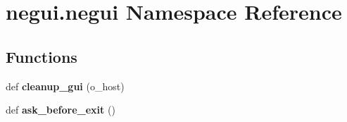 \hypertarget{namespacenegui_1_1negui}{}\section{negui.\+negui Namespace Reference}
\label{namespacenegui_1_1negui}
\subsection*{Functions}
\begin{DoxyCompactItemize}
\item 
def {\bfseries cleanup\+\_\+gui} (o\+\_\+host)\hypertarget{namespacenegui_1_1negui_a633f9fe59f5e342abb4e0902629dbfd4}{}\label{namespacenegui_1_1negui_a633f9fe59f5e342abb4e0902629dbfd4}

\item 
def {\bfseries ask\+\_\+before\+\_\+exit} ()\hypertarget{namespacenegui_1_1negui_a2aa2a75db3418b5a53ed437dce9938fb}{}\label{namespacenegui_1_1negui_a2aa2a75db3418b5a53ed437dce9938fb}

\end{DoxyCompactItemize}

